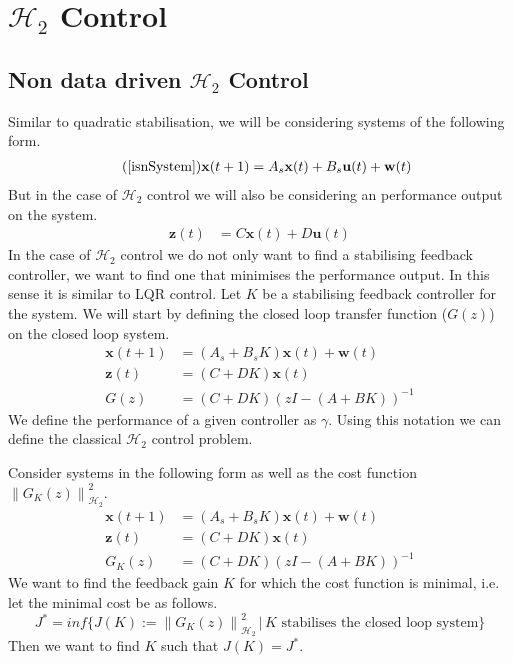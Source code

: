 \section{$\mathcal{H}_2$ Control}


\subsection{Non data driven $\mathcal{H}_2$ Control}
Similar to quadratic stabilisation, we will be considering systems of the following form.
\begin{align} \tag{\ref{isnSystem}}
\mathbf{x}(t+1) &= A_s \mathbf{x}(t) + B_s \mathbf{u}(t) + \mathbf{w}(t)
\end{align}
But in the case of $\mathcal{H}_2$ control we will also be considering an performance output on the system.
\begin{align*}
	\mathbf{z}(t) &= C \mathbf{x}(t) + D \mathbf{u}(t)
\end{align*}
In the case of $\mathcal{H}_2$ control we do not only want to find a stabilising feedback controller, we want to find one that minimises the performance output. In this sense it is similar to LQR control. Let $K$ be a stabilising feedback controller for the system. We will start by defining the closed loop transfer function ($G(z)$) on the closed loop system.
\begin{align*}
	\mathbf{x}(t+1) &= (A_s + B_s K) \mathbf{x}(t) + \mathbf{w}(t) \\
	\mathbf{z}(t)   &= (C   + D   K) \mathbf{x}(t) \\
	G(z) &= (C + DK)(z I - (A+BK))^{-1}
\end{align*}
We define the performance of a given controller as $\gamma$. Using this notation we can define the classical $\mathcal{H}_2$ control problem.

\cite[Problem 11.1]{bookTrentelman} Consider systems in the following form as well as the cost function $\left\| G_K(z) \right\|^2_{\mathcal{H}_2}$.
\begin{align*}
	\mathbf{x}(t+1) &= (A_s + B_s K) \mathbf{x}(t) + \mathbf{w}(t) \\
	\mathbf{z}(t)   &= (C   + D   K) \mathbf{x}(t) \\
	G_K(z) &= (C + DK)(z I - (A+BK))^{-1}
\end{align*}
We want to find the feedback gain $K$ for which the cost function is minimal, i.e. let the minimal cost be as follows.
\begin{equation*}
	J^\ast = inf \{ J(K) := \left\| G_K(z) \right\|^2_{\mathcal{H}_2} \, | \, K \mbox{ stabilises the closed loop system}\}
\end{equation*}
Then we want to find $K$ such that $J(K) = J^\ast$.

